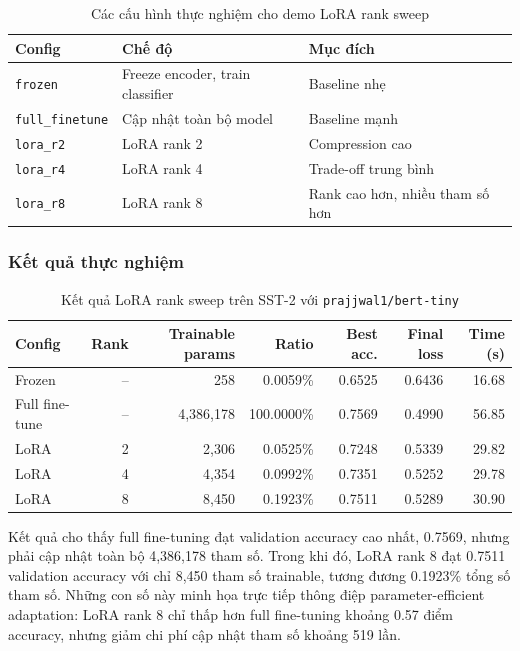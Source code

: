 \begin{table}[H]
\centering
\caption{Các cấu hình thực nghiệm cho demo LoRA rank sweep}
\label{tab:lora-configs}
\renewcommand{\arraystretch}{1.2}
\begin{tabular}{lll}
\toprule
\textbf{Config} & \textbf{Chế độ} & \textbf{Mục đích} \\
\midrule
\texttt{frozen} & Freeze encoder, train classifier & Baseline nhẹ \\
\texttt{full\_finetune} & Cập nhật toàn bộ model & Baseline mạnh \\
\texttt{lora\_r2} & LoRA rank 2 & Compression cao \\
\texttt{lora\_r4} & LoRA rank 4 & Trade-off trung bình \\
\texttt{lora\_r8} & LoRA rank 8 & Rank cao hơn, nhiều tham số hơn \\
\bottomrule
\end{tabular}
\end{table}

\subsubsection{Kết quả thực nghiệm}

\begin{table}[H]
\centering
\caption{Kết quả LoRA rank sweep trên SST-2 với \texttt{prajjwal1/bert-tiny}}
\label{tab:lora-results}
\small
\renewcommand{\arraystretch}{1.2}
\begin{tabular}{lrrrrrr}
\toprule
\textbf{Config} & \textbf{Rank} & \textbf{Trainable params} &
\textbf{Ratio} & \textbf{Best acc.} & \textbf{Final loss} & \textbf{Time (s)} \\
\midrule
Frozen & -- & 258 & 0.0059\% & 0.6525 & 0.6436 & 16.68 \\
Full fine-tune & -- & 4,386,178 & 100.0000\% & 0.7569 & 0.4990 & 56.85 \\
LoRA & 2 & 2,306 & 0.0525\% & 0.7248 & 0.5339 & 29.82 \\
LoRA & 4 & 4,354 & 0.0992\% & 0.7351 & 0.5252 & 29.78 \\
LoRA & 8 & 8,450 & 0.1923\% & 0.7511 & 0.5289 & 30.90 \\
\bottomrule
\end{tabular}
\end{table}

Kết quả cho thấy full fine-tuning đạt validation accuracy cao nhất, 0.7569,
nhưng phải cập nhật toàn bộ 4,386,178 tham số. Trong khi đó, LoRA rank 8 đạt
0.7511 validation accuracy với chỉ 8,450 tham số trainable, tương đương
0.1923\% tổng số tham số. Những con số này minh họa trực tiếp thông điệp
parameter-efficient adaptation: LoRA rank 8 chỉ thấp hơn full fine-tuning khoảng
0.57 điểm accuracy, nhưng giảm chi phí cập nhật tham số khoảng 519 lần.

